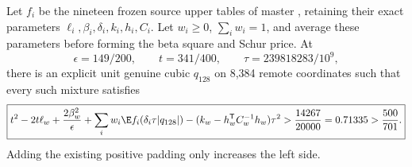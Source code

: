 \begin{proposition}
Let $f_i$ be the nineteen frozen source upper tables of master
, retaining their exact parameters $\ell_i,\beta_i,\delta_i,
k_i,h_i,C_i$. Let $w_i\ge0$, $\sum_iw_i=1$, and average these parameters
before forming the beta square and Schur price. At
\[
 \epsilon=149/200,\qquad t=341/400,\qquad
 \tau=239818283/10^9,
\]
there is an explicit unit genuine cubic $q_{128}$ on 8,384 remote coordinates
such that every such mixture satisfies
\begin{equation}\label{eq:genuine-frozen-table-floor}
 \boxed{t^2-2t\ell_w+\frac{2\beta_w^2}{\epsilon}
 +\sum_iw_i\E f_i(\delta_i\tau|q_{128}|)
 -(k_w-h_w^{\mathsf T}C_w^{-1}h_w)\tau^2
 >\frac{14267}{20000}=0.71335>\frac{500}{701}.}
\end{equation}
Adding the existing positive padding only increases the left side.
\end{proposition}
